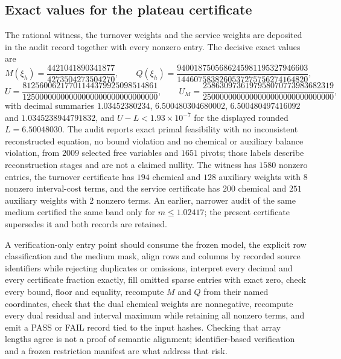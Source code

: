\documentclass[11pt,a4paper]{article}
\theoremstyle{plain}
\theoremstyle{definition}
\theoremstyle{remark}
\begin{document}
\subsection*{Exact values for the plateau certificate}
The rational witness, the turnover weights and the service weights are
deposited in the audit record together with every nonzero entry. The decisive
exact values are
\[
M(\xi_h)=\frac{4421041890341877}{4273504273504270},
\qquad
Q(\xi_h)=\frac{9400187505686245981195327946603}
{1446075838260537275756274164820},
\]
\[
U=\frac{81256006217701144379925098514861}
{12500000000000000000000000000000},
\qquad
U_M=\frac{2586309736197958070773983682319}
{2500000000000000000000000000000},
\]
with decimal summaries $1.03452380234$, $6.500480304680002$,
$6.500480497416092$ and $1.0345238944791832$, and $U-L<1.93\times10^{-7}$ for
the displayed rounded $L=6.50048030$. The audit reports exact primal
feasibility with no inconsistent reconstructed equation, no bound violation and
no chemical or auxiliary balance violation, from $2009$ selected free variables
and $1651$ pivots; those labels describe reconstruction stages and are not a
claimed nullity. The witness has $1580$ nonzero entries, the turnover
certificate has $194$ chemical and $128$ auxiliary weights with $8$ nonzero
interval-cost terms, and the service certificate has $200$ chemical and $251$
auxiliary weights with $2$ nonzero terms. An earlier, narrower audit of the
same medium certified the same band only for $m\le1.02417$; the present
certificate supersedes it and both records are retained.

A verification-only entry point should consume the frozen model, the explicit
row classification and the medium mask, align rows and columns by recorded
source identifiers while rejecting duplicates or omissions, interpret every
decimal and every certificate fraction exactly, fill omitted sparse entries
with exact zero, check every bound, floor and equality, recompute $M$ and $Q$
from their named coordinates, check that the dual chemical weights are
nonnegative, recompute every dual residual and interval maximum while retaining
all nonzero terms, and emit a PASS or FAIL record tied to the input hashes.
Checking that array lengths agree is not a proof of semantic alignment;
identifier-based verification and a frozen restriction manifest are what
address that risk.
\end{document}
